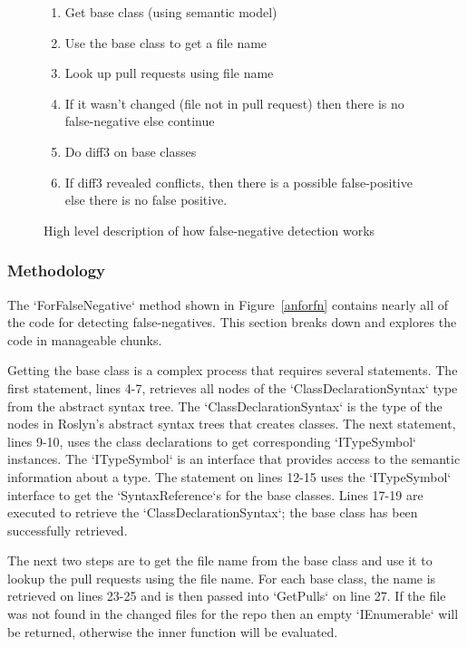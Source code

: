 \documentclass[draftclsnofoot,onecolumn]{IEEEtran}
\begin{document}
\begin{figure}[!t]
\centering
\begin{enumerate}
    \item Get base class (using semantic model)
    \item Use the base class to get a file name
    \item Look up pull requests using file name
    \item If it wasn’t changed (file not in pull request) then there is no 
false-negative else continue
    \item Do diff3 on base classes
    \item If diff3 revealed conflicts, then there is a possible false-positive 
else there is no false positive.
\end{enumerate}
\caption{High level description of how false-negative detection works}
\label{fnalgore}
\end{figure}

\subsubsection{Methodology}
The `ForFalseNegative` method shown in Figure~\ref{anforfn} contains nearly all 
of the code for detecting false-negatives. This section breaks down and 
explores the code in manageable chunks.

Getting the base class is a complex process that requires several statements. 
The first statement, lines 4-7, retrieves all nodes of the  
`ClassDeclarationSyntax` type from the abstract syntax tree. The 
`ClassDeclarationSyntax` is the type of the nodes in Roslyn’s abstract syntax 
trees that creates classes. The next statement, lines 9-10, uses the class 
declarations to get corresponding `ITypeSymbol` instances. The `ITypeSymbol` is 
an interface that provides access to the semantic information about a type. The 
statement on lines 12-15 uses the `ITypeSymbol` interface to get the 
`SyntaxReference`s for the base classes. Lines 17-19 are executed to retrieve 
the `ClassDeclarationSyntax`; the base class has been successfully retrieved.

The next two steps are to get the file name from the base class and use it to 
lookup the pull requests using the file name. For each base class, the name is 
retrieved on lines 23-25 and is then passed into `GetPulls` on line 27. If the 
file was not found in the changed files for the repo then an empty 
`IEnumerable` will be returned, otherwise the inner function will be evaluated.
\end{document}

